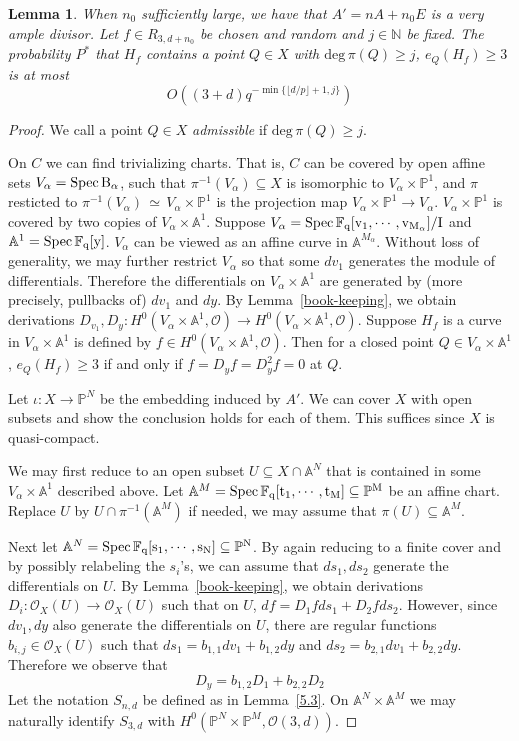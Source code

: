 \documentclass[12pt]{article}
\theoremstyle{plain}
\newtheorem{lemma}[equation]{Lemma}
\theoremstyle{definition}
\newcommand{\IA}{\mathbb{A}}
\newcommand{\IN}{\mathbb{N}}
\newcommand{\IF}{\mathbb{F}}
\newcommand{\IP}{\mathbb{P}}
\newcommand{\sO}{\mathcal{O}}
\renewcommand{\deg}{\mathrm{deg}\,}
\newcommand{\Spec}{\rm Spec\,}
\newcommand\iso{{\, \simeq \,}}
\newcommand{\<}{\langle}
\renewcommand{\>}{\rangle}
\begin{document}
\begin{lemma}
\label{Decoup}
When $n_0$ sufficiently large, we have that $A' = nA + n_0 E$ is a very ample divisor. Let $f \in R_{3, d+n_0}$ be chosen and random and $j \in \IN$ be fixed. The probability $P^*$ that $H_f$ contains a point $Q \in X$ with $\deg \pi(Q) \ge j$, $e_Q(H_f) \ge 3$ is at most
$$ O((3 + d)q^{- \min\{ \lfloor d/p \rfloor + 1, j    \}})$$
\end{lemma}
\begin{proof}
We call a point $Q \in X$ \textit{admissible} if $\deg \pi(Q) \ge j$. 


On $C$ we can find trivializing charts. That is, $C$ can be covered by open affine sets $V_\alpha = \Spec B_\alpha$, such that $\pi^{-1}(V_\alpha) \subseteq X$ is isomorphic to $V_\alpha \times \IP^1$, and $\pi$ resticted to $\pi^{-1}(V_\alpha) \iso V_\alpha \times \IP^1$ is the projection map $V_\alpha \times \IP^1 \to V_\alpha$. 
$V_\alpha \times \IP^1$ is covered by two copies of $V_\alpha \times \IA^1$.  Suppose $V_\alpha = \Spec \IF_q[v_1, \cdots, v_{M_\alpha}]/I$ and $\IA^1 = \Spec \IF_q[y]$. $V_\alpha$ can be viewed as an affine curve in $\IA^{M_\alpha}$. Without loss of generality, we may further restrict $V_\alpha$ so that some $d v_1$ generates the module of differentials. Therefore the differentials on $V_\alpha \times \IA^1$ are generated by (more precisely, pullbacks of) $dv_1$ and $dy$. By Lemma~\ref{book-keeping}, we obtain derivations $D_{v_1}, D_y : H^0(V_\alpha \times \IA^1, \sO) \to H^0(V_\alpha \times \IA^1, \sO)$. Suppose $H_f$ is a curve in $V_\alpha \times \IA^1$ is defined by $f \in H^0(V_\alpha \times \IA^1, \sO)$. Then for a closed point $Q \in V_\alpha \times \IA^1$, $e_{Q}(H_f) \ge 3$ if and only if $f = D_y f = D_y^2 f = 0$ at $Q$. 

Let $\iota : X \to \IP^N$ be the embedding induced by $A'$. We can cover $X$ with open subsets and show the conclusion holds for each of them. This suffices since $X$ is quasi-compact.

We may first reduce to an open subset $U \subseteq X \cap \IA^N$ that is contained in some $V_\alpha \times \IA^1$ described above. Let $\IA^M = \Spec \IF_q[t_1, \cdots, t_M] \subseteq \IP^M$ be an affine chart. Replace $U$ by $U \cap \pi^{-1}(\IA^M)$ if needed, we may assume that $\pi(U) \subseteq \IA^M$.

Next let $\IA^N = \Spec \IF_q[s_1, \cdots, s_N] \subseteq \IP^N$. By again reducing to a finite cover and by possibly relabeling the $s_i$'s, we can assume that $ds_1, ds_2$ generate the differentials on $U$. By Lemma~\ref{book-keeping}, we obtain derivations $D_i : \sO_X(U) \to \sO_X(U)$ such that on $U$, $df = D_1 f ds_1 + D_2 f ds_2$. However, since $d v_1, dy$ also generate the differentials on $U$, there are regular functions $b_{i,j} \in \sO_X(U)$ such that $ds_1 = b_{1, 1} dv_1 + b_{1, 2} dy$ and $ds_2 = b_{2, 1} dv_1 + b_{2, 2} dy$. Therefore we observe that
$$ D_y = b_{1, 2} D_1 + b_{2,2} D_2$$
Let the notation $S_{n, d}$ be defined as in Lemma~\ref{5.3}. On $\IA^N \times \IA^M$ we may naturally identify $S_{3, d}$ with $H^0(\IP^N \times \IP^M, \sO(3, d))$. 


\end{proof}
\end{document}
